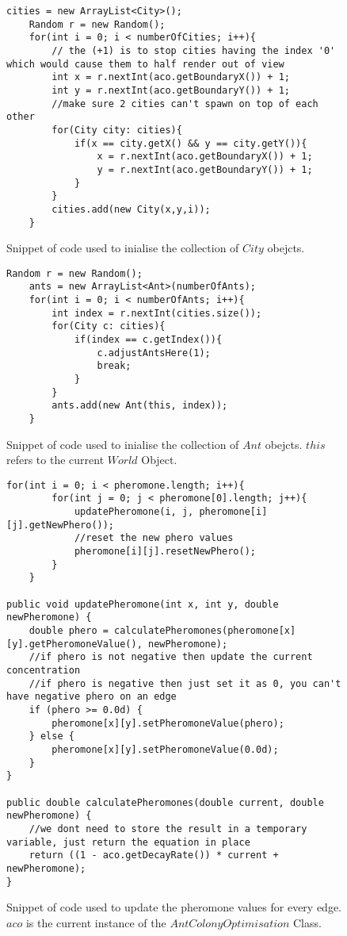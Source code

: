 \begin{figure}[H]
\begin{lstlisting}
cities = new ArrayList<City>();
	Random r = new Random();
	for(int i = 0; i < numberOfCities; i++){
		// the (+1) is to stop cities having the index '0' which would cause them to half render out of view
		int x = r.nextInt(aco.getBoundaryX()) + 1;
		int y = r.nextInt(aco.getBoundaryY()) + 1;
		//make sure 2 cities can't spawn on top of each other
		for(City city: cities){
			if(x == city.getX() && y == city.getY()){
				x = r.nextInt(aco.getBoundaryX()) + 1;
				y = r.nextInt(aco.getBoundaryY()) + 1;
			}
		}
		cities.add(new City(x,y,i));	
	}
\end{lstlisting}
\caption[City Collection Initialisation Code]{Snippet of code used to inialise the collection of $City$ obejcts.}
\label{initCity}
\end{figure}

\begin{figure}[H]
\begin{lstlisting}
Random r = new Random();
	ants = new ArrayList<Ant>(numberOfAnts);
	for(int i = 0; i < numberOfAnts; i++){
		int index = r.nextInt(cities.size());
		for(City c: cities){
			if(index == c.getIndex()){
				c.adjustAntsHere(1);
				break;
			}
		}
		ants.add(new Ant(this, index));
	}
\end{lstlisting}
\caption[Ant Collection Initialisation Code]{Snippet of code used to inialise the collection of $Ant$ obejcts. $this$ refers to the current $World$ Object.}
\label{initAnt}
\end{figure}

\begin{figure}[H]
\begin{lstlisting}
for(int i = 0; i < pheromone.length; i++){
		for(int j = 0; j < pheromone[0].length; j++){
			updatePheromone(i, j, pheromone[i][j].getNewPhero());
			//reset the new phero values
			pheromone[i][j].resetNewPhero();
		}
	}

public void updatePheromone(int x, int y, double newPheromone) {
	double phero = calculatePheromones(pheromone[x][y].getPheromoneValue(), newPheromone);
	//if phero is not negative then update the current concentration
	//if phero is negative then just set it as 0, you can't have negative phero on an edge
	if (phero >= 0.0d) {
		pheromone[x][y].setPheromoneValue(phero);
	} else {
		pheromone[x][y].setPheromoneValue(0.0d);
	}
}

public double calculatePheromones(double current, double newPheromone) {
	//we dont need to store the result in a temporary variable, just return the equation in place
	return ((1 - aco.getDecayRate()) * current + newPheromone);
}	
\end{lstlisting}
\caption[Pheromone Update Code]{Snippet of code used to update the pheromone values for every edge. $aco$ is the current instance of the $AntColonyOptimisation$ Class.}
\label{codephero}
\end{figure}

